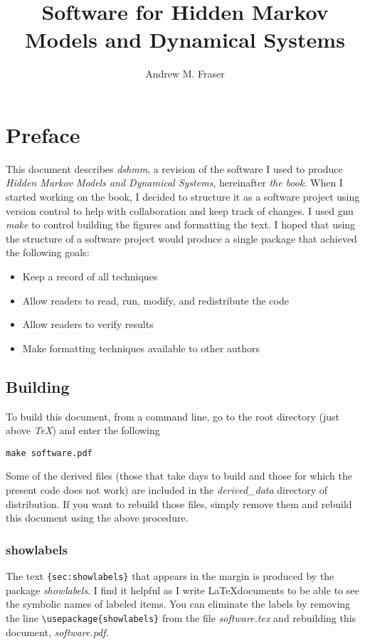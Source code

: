 \documentclass[prelim,showlabels]{book}
\author{Andrew M. Fraser}
\title{Software for Hidden Markov Models and Dynamical Systems}
\begin{document}
\frontmatter
\maketitle

\chapter{Preface}
\label{chap:preface}

This document describes \emph{dshmm}, a revision of the software I
used to produce \emph{Hidden Markov Models and Dynamical Systems},
hereinafter \emph{the book}.  When I started working on the book, I
decided to structure it as a software project using version control to
help with collaboration and keep track of changes.  I used gnu
\emph{make} to control building the figures and formatting the text.
I hoped that using the structure of a software project would produce a
single package that achieved the following goals:
\begin{itemize}
\item Keep a record of all techniques
\item Allow readers to read, run, modify, and redistribute the code
\item Allow readers to verify results
\item Make formatting techniques available to other authors
\end{itemize}

\section*{Building}
\label{sec:building}

To build this document, from a command line, go to the root directory
(just above \emph{TeX}) and enter the following
\begin{center}
  \texttt{make software.pdf}
\end{center}
Some of the derived files (those that take days to build and those for
which the present code does not work) are included in the
\emph{derived\_data} directory of distribution.  If you want to
rebuild those files, simply remove them and rebuild this document
using the above procedure.

\subsection*{showlabels}
\label{sec:showlabels}

The text \texttt{\{sec:showlabels\}} that appears in the margin is
produced by the package \emph{showlabels}.  I find it helpful as I
write \LaTeX documents to be able to see the symbolic names of labeled
items.  You can eliminate the labels by removing the line
\texttt{\textbackslash usepackage\{showlabels\}} from the file
\emph{software.tex} and rebuilding this document, \emph{software.pdf}.
\end{document}
